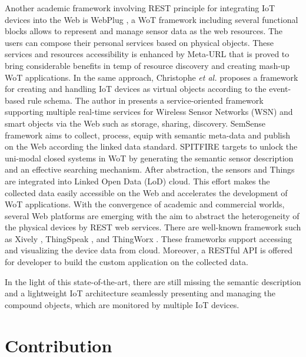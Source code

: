Another academic framework involving REST principle for integrating IoT devices into the Web is WebPlug \cite{ostermaier2010webplug}, a WoT framework including several functional blocks allows to represent and manage sensor data as the web resources. The users can compose their personal services based on physical objects. These services and resources accessibility is enhanced by Meta-URL that is proved to bring considerable benefits in temp of resource discovery and creating mash-up WoT applications. In the same approach, Christophe \textit{et al.} \cite{christophe2011web} proposes a framework for creating and handling IoT devices as virtual objects according to the event-based rule schema. The author in \cite{orestis2012towards} presents a service-oriented framework supporting multiple real-time services for  Wireless Sensor Networks (WSN) and smart objects via the Web such as storage, sharing, discovery. SemSense framework \cite{moraru2011exposing} aims to collect, process, equip with semantic meta-data and publish on the Web according the linked data standard. SPITFIRE \cite{pfisterer2011spitfire} targets to unlock the uni-modal closed systems in WoT by generating the semantic sensor description and an effective searching mechanism. After abstraction, the sensors and Things are integrated into Linked Open Data (LoD) cloud. This effort makes the collected data easily accessible on the Web and accelerates the development of WoT applications. With the convergence of academic and commercial worlds, several Web platforms are emerging with the aim to abstract the heterogeneity of the physical devices by REST web services. There are well-known framework such as Xively \cite{Doe:2009:Online}, ThingSpeak \cite{thinkspeak:Online}, and ThingWorx \cite{thingworx:Online}. These frameworks support accessing and visualizing the device data from cloud. Moreover, a RESTful API is offered for developer to build the custom application on the collected data.

In the light of this state-of-the-art, there are still missing the semantic description and a lightweight IoT architecture seamlessly presenting and managing the compound objects, which are monitored by multiple IoT devices.
\section{Contribution}
